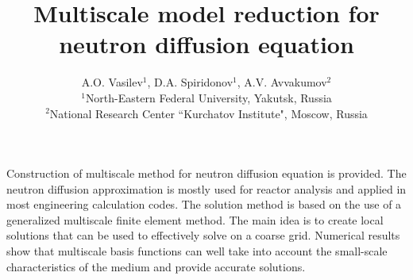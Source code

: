 \documentclass[12pt,a4paper]{article}
\title{\bf  Multiscale model reduction for neutron diffusion equation}
\author{A.O. Vasilev$^{1}$, D.A. Spiridonov$^{1}$, A.V. Avvakumov$^{2}$\\ 
 $^1$North-Eastern Federal University, Yakutsk, Russia\\
$^2$National Research Center ``Kurchatov Institute", Moscow, Russia}
\date{}
\begin{document}
 

\maketitle 

Construction of multiscale method for neutron diffusion equation is provided. 
The neutron diffusion approximation is mostly used for reactor analysis and applied in most engineering calculation codes. 
The solution method is based on the use of a generalized multiscale finite element method.
The main idea is to create local solutions that can be used to effectively solve on a coarse grid.
Numerical results show that multiscale basis functions can well take into account the small-scale characteristics of the medium and provide accurate solutions.
\end{document}
